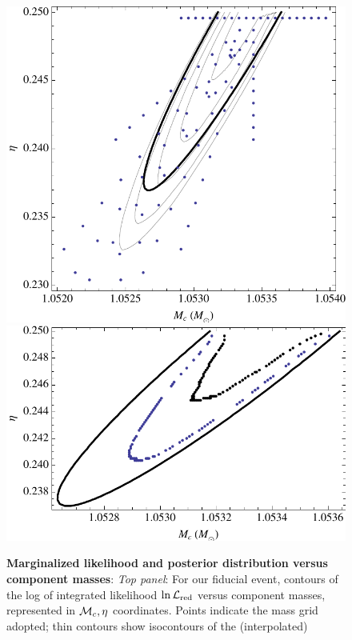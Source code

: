 \begin{figure}
\includegraphics[width=\columnwidth]{../Figures/fig-mma-manual-coinc833-LReducedVersusMcEta}
\includegraphics[width=\columnwidth]{../Figures/fig-mma-manual-coinc833-PosteriorMcEta}
\caption{\label{fig:FiducialEvent:LikelihoodVersusMchirpEta}\textbf{Marginalized likelihood and posterior distribution
    versus component masses}: \emph{Top panel}: 
For our fiducial event,
  contours of the log of integrated likelihood $\ln {\cal L}_{\rm red}$ versus component masses, represented in ${{\cal M}_c},\eta$
  coordinates.  Points indicate the mass grid adopted; thin contours show isocontours of the (interpolated)
}
\end{figure}
